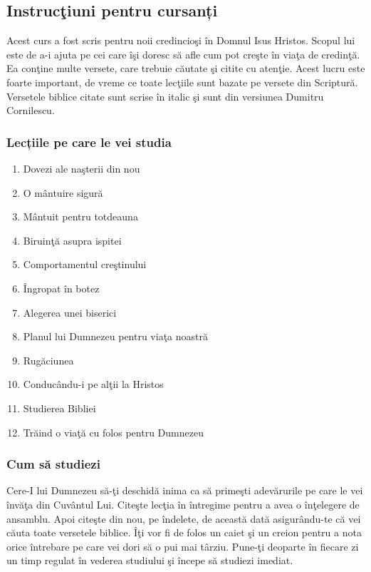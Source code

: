 

\subsection*{Instrucţiuni pentru cursanți}

Acest curs a fost scris pentru noii credincioşi în Domnul Isus Hristos. Scopul lui este de a-i ajuta pe cei care îşi doresc să afle cum pot creşte în viaţa de credinţă. Ea conţine multe versete, care trebuie căutate şi citite cu atenţie. Acest lucru este foarte important, de vreme ce toate lecţiile sunt bazate pe versete din Scriptură. Versetele biblice citate sunt scrise în italic şi sunt din versiunea Dumitru Cornilescu.

\subsubsection*{Lecțiile pe care le vei studia}

\begin{enumerate}
\itemsep0em 
	\item Dovezi ale naşterii din nou
	\item O mântuire sigură
	\item Mântuit pentru totdeauna
	\item Biruinţă asupra ispitei
	\item Comportamentul creştinului
	\item Îngropat în botez
	\item Alegerea unei biserici
	\item Planul lui Dumnezeu pentru viaţa noastră
	\item Rugăciunea
	\item Conducându-i pe alţii la Hristos
	\item Studierea Bibliei
	\item Trăind o viaţă cu folos pentru Dumnezeu
\end{enumerate}


\subsubsection*{Cum să studiezi}

Cere-I lui Dumnezeu să-ţi deschidă inima ca să primeşti adevărurile pe care le vei învăţa din Cuvântul Lui. Citeşte lecţia în întregime pentru a avea o înţelegere de ansamblu. Apoi citeşte din nou, pe îndelete, de această dată asigurându-te că vei căuta toate versetele biblice. Îţi vor fi de folos un caiet şi un creion pentru a nota orice întrebare pe care vei dori să o pui mai târziu. Pune-ţi deoparte în fiecare zi un timp regulat în vederea studiului şi începe să studiezi imediat.

